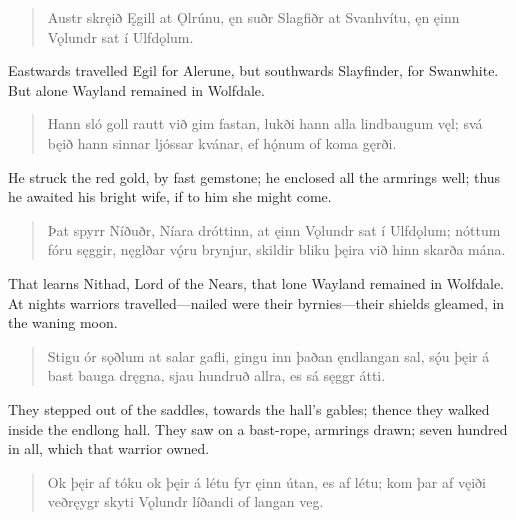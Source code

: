 \begin{verse}
\bva Austr skręið Ęgill \hld at Ǫlrúnu,
ęn suðr Slagfiðr \hld at Svanhvítu,
ęn ęinn Vǫlundr \hld sat í Ulfdǫlum. \\%
\end{verse}

\bvb Eastwards travelled Egil for Alerune, but southwards Slayfinder, for Swanwhite. But alone Wayland remained in Wolfdale. \\

\begin{verse}
\bva Hann sló goll rautt \hld við gim fastan,
lukði hann alla \hld lindbaugum vęl;
svá bęið hann \hld sinnar ljóssar
kvánar, ef hǫ́num \hld of koma gęrði. \\%
\end{verse}

\bvb He struck the red gold, by fast gemstone; he enclosed all the armrings well; thus he awaited his bright wife, if to him she might come. \\

\begin{verse}
\bva Þat spyrr Níðuðr, \hld Níara dróttinn,
at ęinn Vǫlundr \hld sat í Ulfdǫlum;
nóttum fóru sęggir, \hld nęglðar vǫ́ru brynjur,
skildir bliku þęira \hld við hinn skarða mána. \\%
\end{verse}

\bvb That learns Nithad, Lord of the Nears, that lone Wayland remained in Wolfdale. At nights warriors travelled—nailed were their byrnies—their shields gleamed, in the waning moon. \\

\begin{verse}
\bva Stigu ór sǫðlum \hld at salar gafli,
gingu inn þaðan \hld ęndlangan sal,
sǫ́u þęir á bast \hld bauga dręgna,
sjau hundruð allra, \hld es sá sęggr átti. \\%
\end{verse}

\bvb They stepped out of the saddles, towards the hall's gables; thence they walked inside the endlong hall. They saw on a bast-rope, armrings drawn; seven hundred in all, which that warrior owned. \\

\begin{verse}
\bva Ok þęir af tóku \hld ok þęir á létu
fyr ęinn útan, \hld es af létu;
kom þar af vęiði \hld veðręygr skyti
Vǫlundr líðandi \hld of langan veg. \\%
\end{verse}

